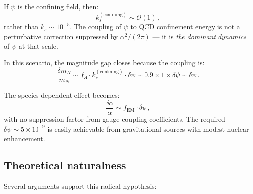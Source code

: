 \documentclass[aps,prd,twocolumn,superscriptaddress,floatfix,nofootinbib]{revtex4-2}
\renewcommand{\order}[1]{\mathcal{O}\!\left(#1\right)}
\newcommand{\fEM}{f_{\mathrm{EM}}}
\newcommand{\mN}{m_N}
\begin{document}
If $\psi$ is the confining field, then:
\begin{equation}
k_s^{(\mathrm{confining})} \sim \order{1} \, ,
\end{equation}
rather than $k_s \sim 10^{-5}$. The coupling of $\psi$ to QCD confinement energy
is not a perturbative correction suppressed by $\alpha^2/(2\pi)$ --- it is
\emph{the dominant dynamics} of $\psi$ at that scale.

In this scenario, the magnitude gap closes because the coupling is:
\begin{equation}
\frac{\delta\mN}{\mN} \sim f_\Lambda \cdot k_s^{(\mathrm{confining})} \cdot
\delta\psi \sim 0.9 \times 1 \times \delta\psi \sim \delta\psi \, .
\end{equation}

The species-dependent effect becomes:
\begin{equation}
\frac{\delta\alpha}{\alpha} \sim \fEM \cdot \delta\psi \, ,
\end{equation}
with no suppression factor from gauge-coupling coefficients. The required
$\delta\psi \sim 5 \times 10^{-9}$ is easily achievable from gravitational
sources with modest nuclear enhancement.

\subsection{Theoretical naturalness}

Several arguments support this radical hypothesis:
\end{document}
